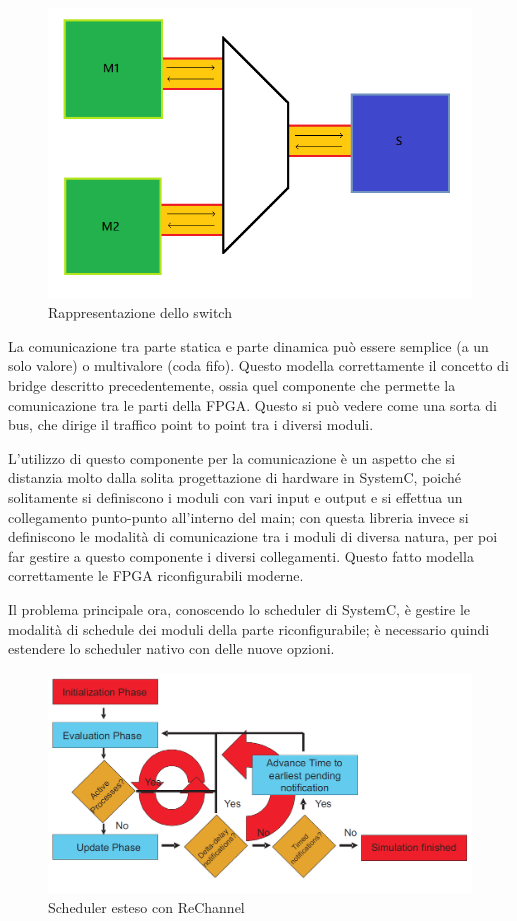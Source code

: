 \documentclass[a4paper,titlepage]{book}
\begin{document}
\begin{figure}[ht]
\centering
\includegraphics[scale=0.5]{portal.png}
\caption{Rappresentazione dello switch}\label{fig:3}
\end{figure}

La comunicazione tra parte statica e parte dinamica può essere semplice (a un solo valore) o multivalore (coda fifo). Questo modella correttamente il concetto di bridge descritto precedentemente, ossia quel componente che permette la comunicazione tra le parti della FPGA. Questo si può vedere come una sorta di bus, che dirige il traffico point to point tra i diversi moduli.

L'utilizzo di questo componente per la comunicazione è un aspetto che si distanzia molto dalla solita progettazione di hardware in SystemC, poiché solitamente si definiscono i moduli con vari input e output e si effettua un collegamento punto-punto all'interno del main; con questa libreria invece si definiscono le modalità di comunicazione tra i moduli di diversa natura, per poi far gestire a questo componente i diversi collegamenti. Questo fatto modella correttamente le FPGA riconfigurabili moderne.

Il problema principale ora, conoscendo lo scheduler di SystemC, è gestire le modalità di schedule dei moduli della parte riconfigurabile; è necessario quindi estendere lo scheduler nativo con delle nuove opzioni.

\begin{figure}[ht]
\centering
\includegraphics[scale=0.5]{scheduler_rechannel.png}
\caption{Scheduler esteso con ReChannel}\label{fig:4}
\end{figure}
\end{document}
